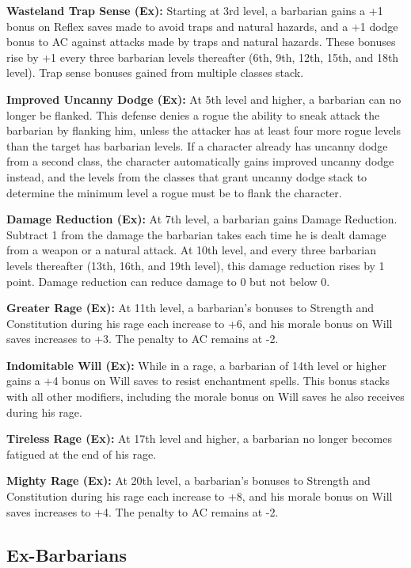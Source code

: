 \documentclass[10pt,a4paper,twocolumn]{d20}
\begin{document}
{\textbf{Wasteland Trap Sense (Ex):} Starting at 3rd level, a barbarian gains a +1 bonus on Reflex saves made to avoid traps and natural hazards, and a +1 dodge bonus to AC against attacks made by traps and natural hazards. These bonuses rise by +1 every three barbarian levels thereafter (6th, 9th, 12th, 15th, and 18th level). Trap sense bonuses gained from multiple classes stack.

\textbf{Improved Uncanny Dodge (Ex):} At 5th level and higher, a barbarian can no longer be flanked. This defense denies a rogue the ability to sneak attack the barbarian by flanking him, unless the attacker has at least four more rogue levels than the target has barbarian levels. If a character already has uncanny dodge from a second class, the character automatically gains improved uncanny dodge instead, and the levels from the classes that grant uncanny dodge stack to determine the minimum level a rogue must be to flank the character.

\textbf{Damage Reduction (Ex):} At 7th level, a barbarian gains Damage Reduction. Subtract 1 from the damage the barbarian takes each time he is dealt damage from a weapon or a natural attack. At 10th level, and every three barbarian levels thereafter (13th, 16th, and 19th level), this damage reduction rises by 1 point. Damage reduction can reduce damage to 0 but not below 0.

\textbf{Greater Rage (Ex):} At 11th level, a barbarian’s bonuses to Strength and Constitution during his rage each increase to +6, and his morale bonus on Will saves increases to +3. The penalty to AC remains at -2.

\textbf{Indomitable Will (Ex):} While in a rage, a barbarian of 14th level or higher gains a +4 bonus on Will saves to resist enchantment spells. This bonus stacks with all other modifiers, including the morale bonus on Will saves he also receives during his rage.

\textbf{Tireless Rage (Ex):} At 17th level and higher, a barbarian no longer becomes fatigued at the end of his rage.

\textbf{Mighty Rage (Ex):} At 20th level, a barbarian’s bonuses to Strength and Constitution during his rage each increase to +8, and his morale bonus on Will saves increases to +4. The penalty to AC remains at -2.

\subsection{Ex-Barbarians}

}
\end{document}
